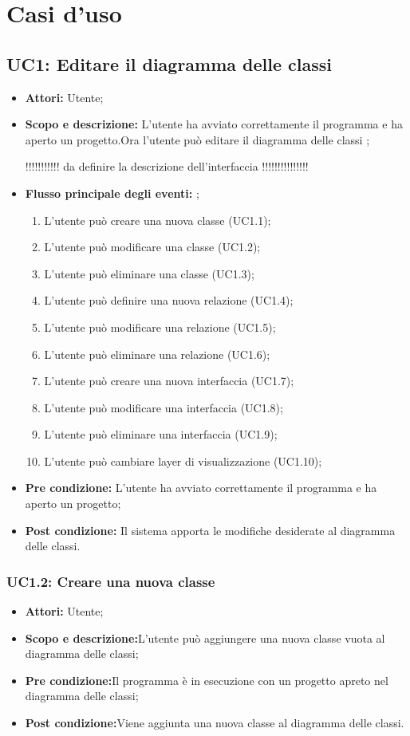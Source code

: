 \documentclass[a4paper]{report}
\begin{document}
\chapter{Casi d'uso }
\section{UC1: Editare il diagramma delle classi}
\begin{itemize}
	\item \textbf{Attori: }Utente;
	\item \textbf{Scopo e descrizione: }L'utente ha avviato correttamente il programma e ha aperto un progetto.Ora l'utente può editare il diagramma delle classi ;
	
	!!!!!!!!!!! da definire la descrizione dell'interfaccia !!!!!!!!!!!!!!!
	
	\item \textbf{Flusso principale degli eventi: } ;
	\begin{enumerate}
		\item L'utente può creare una nuova classe (UC1.1);
		\item L'utente può modificare una classe (UC1.2);
		\item L'utente può eliminare una classe (UC1.3);
		\item L'utente può definire una nuova relazione (UC1.4);
		\item L'utente può modificare una relazione (UC1.5);
		\item L'utente può eliminare una relazione (UC1.6);
		\item L'utente può creare una nuova interfaccia (UC1.7);
		\item L'utente può modificare una interfaccia (UC1.8);
		\item L'utente può eliminare una interfaccia (UC1.9);
		\item L'utente può cambiare layer di visualizzazione (UC1.10);
	\end{enumerate}
	\item \textbf{Pre condizione: }L'utente ha avviato correttamente il programma e ha aperto un progetto;
	\item \textbf{Post condizione: }Il sistema apporta le modifiche desiderate al diagramma delle classi.
\end{itemize}

\subsection{UC1.2: Creare una nuova classe}
\begin{itemize}
	\item \textbf{Attori:} Utente;
	\item \textbf{Scopo e descrizione:}L'utente può aggiungere una nuova classe vuota al diagramma delle classi;
	\item \textbf{Pre condizione:}Il programma è in esecuzione con un progetto apreto nel diagramma delle classi;
	\item \textbf{Post condizione:}Viene aggiunta una nuova classe al diagramma delle classi.
\end{itemize}
\end{document}
